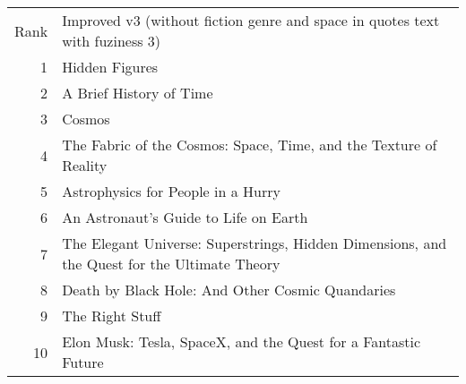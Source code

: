 \begin{tabular}{rl}
Rank & Improved v3 (without fiction genre and space in quotes text with fuziness 3) \\
1 & Hidden Figures \\
2 & A Brief History of Time \\
3 & Cosmos \\
4 & The Fabric of the Cosmos: Space, Time, and the Texture of Reality \\
5 & Astrophysics for People in a Hurry \\
6 & An Astronaut's Guide to Life on Earth \\
7 & The Elegant Universe: Superstrings, Hidden Dimensions, and the Quest for the Ultimate Theory \\
8 & Death by Black Hole: And Other Cosmic Quandaries \\
9 & The Right Stuff \\
10 & Elon Musk: Tesla, SpaceX, and the Quest for a Fantastic Future \\
\end{tabular}
